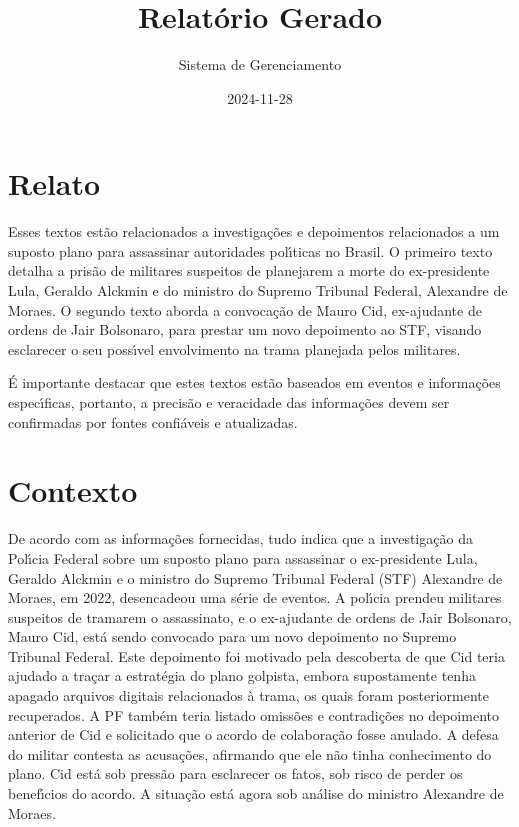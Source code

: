 \documentclass[article,11pt,oneside,a4paper,brazil,sumario=tradicional]{abntex2}%
\title{Relatório Gerado}%
\author{Sistema de Gerenciamento}%
\date{2024{-}11{-}28}%
\begin{document}
%
\normalsize%
\maketitle%
%
\frenchspacing%
\section{Relato}%
\label{sec:Relato}%
Esses textos est\~ao relacionados a investiga\c{c}\~oes e depoimentos relacionados a um suposto plano para assassinar autoridades pol{\'\i}ticas no Brasil. O primeiro texto detalha a pris\~ao de militares suspeitos de planejarem a morte do ex-presidente Lula, Geraldo Alckmin e do ministro do Supremo Tribunal Federal, Alexandre de Moraes. O segundo texto aborda a convoca\c{c}\~ao de Mauro Cid, ex-ajudante de ordens de Jair Bolsonaro, para prestar um novo depoimento ao STF, visando esclarecer o seu poss{\'\i}vel envolvimento na trama planejada pelos militares.

\'E importante destacar que estes textos est\~ao baseados em eventos e informa\c{c}\~oes espec{\'\i}ficas, portanto, a precis\~ao e veracidade das informa\c{c}\~oes devem ser confirmadas por fontes confi\'aveis e atualizadas.

%
\section{Contexto}%
\label{sec:Contexto}%
De acordo com as informa\c{c}\~oes fornecidas, tudo indica que a investiga\c{c}\~ao da Pol{\'\i}cia Federal sobre um suposto plano para assassinar o ex-presidente Lula, Geraldo Alckmin e o ministro do Supremo Tribunal Federal (STF) Alexandre de Moraes, em 2022, desencadeou uma s\'erie de eventos. A pol{\'\i}cia prendeu militares suspeitos de tramarem o assassinato, e o ex-ajudante de ordens de Jair Bolsonaro, Mauro Cid, est\'a sendo convocado para um novo depoimento no Supremo Tribunal Federal. Este depoimento foi motivado pela descoberta de que Cid teria ajudado a tra\c{c}ar a estrat\'egia do plano golpista, embora supostamente tenha apagado arquivos digitais relacionados \`a trama, os quais foram posteriormente recuperados. A PF tamb\'em teria listado omiss\~oes e contradi\c{c}\~oes no depoimento anterior de Cid e solicitado que o acordo de colabora\c{c}\~ao fosse anulado. A defesa do militar contesta as acusa\c{c}\~oes, afirmando que ele n\~ao tinha conhecimento do plano. Cid est\'a sob press\~ao para esclarecer os fatos, sob risco de perder os benef{\'\i}cios do acordo. A situa\c{c}\~ao est\'a agora sob an\'alise do ministro Alexandre de Moraes.
\end{document}
